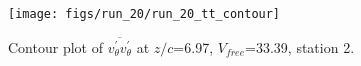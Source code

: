 \begin{figure}[H]
\centering
\texttt{[image: figs/run\_20/run\_20\_tt\_contour]}
\caption{Contour plot of $\overline{v_{\theta}^{\prime} v_{\theta}^{\prime}}$ at $z/c$=6.97, $V_{free}$=33.39, station 2.}
\label{fig:run_20_tt_contour}
\end{figure}


